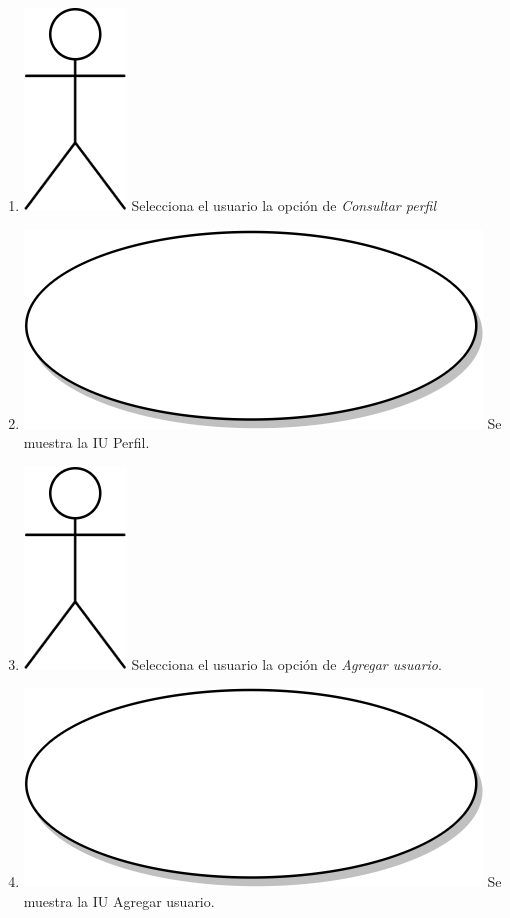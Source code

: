 \begin{enumerate}
\item {\includegraphics[scale=.1]{Capitulo3/img/actor.png} Selecciona el usuario la opción de \textit{Consultar perfil}}
\item {\includegraphics[scale=.05]{Capitulo3/img/proceso.png} Se muestra la IU Perfil.}
\item {\includegraphics[scale=.1]{Capitulo3/img/actor.png} Selecciona el usuario la opción de \textit{Agregar usuario}.}
\item {\includegraphics[scale=.05]{Capitulo3/img/proceso.png} Se muestra la IU Agregar usuario.}

\end{enumerate}
